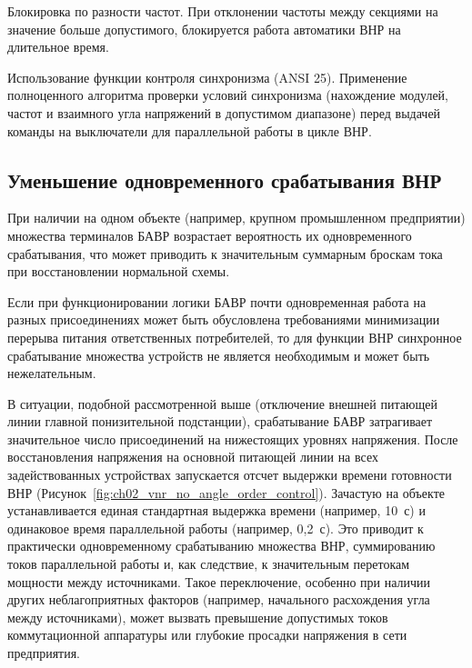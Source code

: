 Блокировка по разности частот. При отклонении частоты между секциями на значение больше
допустимого, блокируется работа автоматики ВНР на длительное время.\par\vspace{0.2cm}

Использование функции контроля синхронизма (ANSI 25). Применение полноценного алгоритма
проверки условий синхронизма (нахождение модулей, частот и взаимного угла напряжений в
допустимом диапазоне) перед выдачей команды на выключатели для параллельной работы в
цикле ВНР.\par\vspace{0.2cm}

\subsection{Уменьшение одновременного срабатывания ВНР}
\label{sec:ch02_vnr_reduce_simultaneous}

При наличии на одном объекте (например, крупном промышленном предприятии) множества
терминалов БАВР возрастает вероятность их одновременного срабатывания, что может
приводить к значительным суммарным броскам тока при восстановлении нормальной
схемы.\par\vspace{0.2cm}

Если при функционировании логики БАВР почти одновременная работа на разных
присоединениях может быть обусловлена требованиями минимизации перерыва питания
ответственных потребителей, то для функции ВНР синхронное срабатывание множества
устройств не является необходимым и может быть нежелательным.\par\vspace{0.2cm}

В ситуации, подобной рассмотренной выше (отключение внешней питающей линии главной
понизительной подстанции), срабатывание БАВР затрагивает значительное число
присоединений на нижестоящих уровнях напряжения. После восстановления напряжения на
основной питающей линии на всех задействованных устройствах запускается отсчет выдержки
времени готовности ВНР (Рисунок~\ref{fig:ch02_vnr_no_angle_order_control}). Зачастую на
объекте устанавливается единая стандартная выдержка времени (например, 10~с) и
одинаковое время параллельной работы (например, 0,2~с). Это приводит к практически
одновременному срабатыванию множества ВНР, суммированию токов параллельной работы и, как
следствие, к значительным перетокам мощности между источниками. Такое переключение,
особенно при наличии других неблагоприятных факторов (например, начального расхождения
угла между источниками), может вызвать превышение допустимых токов коммутационной
аппаратуры или глубокие просадки напряжения в сети предприятия.\par\vspace{0.2cm}


